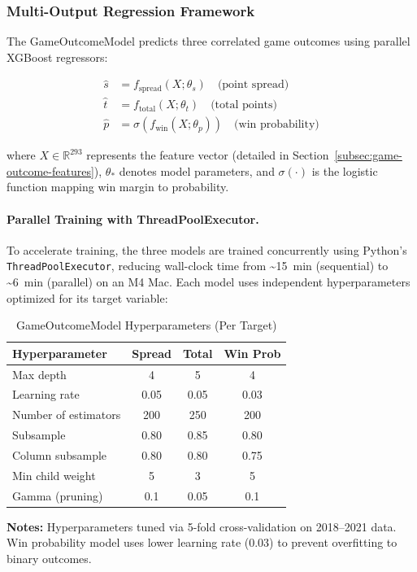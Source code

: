 \subsubsection{Multi-Output Regression Framework}

The GameOutcomeModel predicts three correlated game outcomes using parallel XGBoost regressors:

\begin{align}
\hat{s} &= f_{\text{spread}}(X; \theta_s) \quad \text{(point spread)} \\
\hat{t} &= f_{\text{total}}(X; \theta_t) \quad \text{(total points)} \\
\hat{p} &= \sigma(f_{\text{win}}(X; \theta_p)) \quad \text{(win probability)}
\end{align}

where $X \in \mathbb{R}^{293}$ represents the feature vector (detailed in Section~\ref{subsec:game-outcome-features}), $\theta_*$ denotes model parameters, and $\sigma(\cdot)$ is the logistic function mapping win margin to probability.

\paragraph{Parallel Training with ThreadPoolExecutor.}
To accelerate training, the three models are trained concurrently using Python's \texttt{ThreadPoolExecutor}, reducing wall-clock time from \SI{~15}{min} (sequential) to \SI{~6}{min} (parallel) on an M4 Mac. Each model uses independent hyperparameters optimized for its target variable:

\begin{table}[htbp]
\centering
\caption{GameOutcomeModel Hyperparameters (Per Target)}
\label{tab:game-outcome-hyperparams}
\small
\begin{tabular}{@{}lccc@{}}
\toprule
\textbf{Hyperparameter} & \textbf{Spread} & \textbf{Total} & \textbf{Win Prob} \\
\midrule
Max depth & 4 & 5 & 4 \\
Learning rate & 0.05 & 0.05 & 0.03 \\
Number of estimators & 200 & 250 & 200 \\
Subsample & 0.80 & 0.85 & 0.80 \\
Column subsample & 0.80 & 0.80 & 0.75 \\
Min child weight & 5 & 3 & 5 \\
Gamma (pruning) & 0.1 & 0.05 & 0.1 \\
\bottomrule
\end{tabular}
\begin{tablenotes}
\item \textbf{Notes:} Hyperparameters tuned via 5-fold cross-validation on 2018--2021 data. Win probability model uses lower learning rate (0.03) to prevent overfitting to binary outcomes.
\end{tablenotes}
\end{table}

